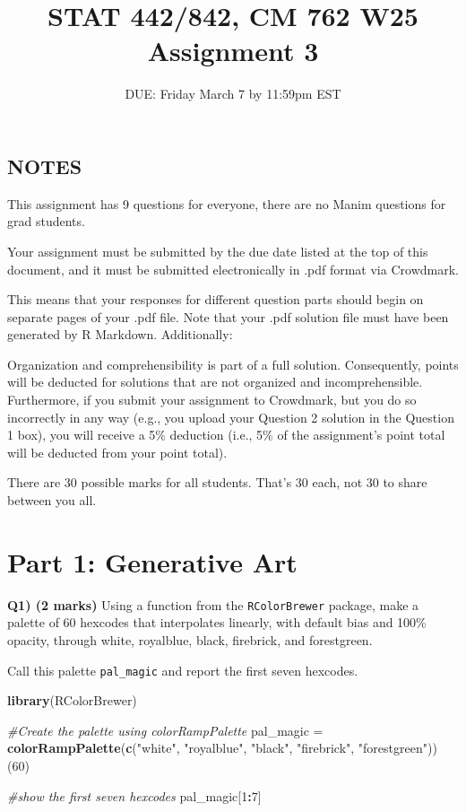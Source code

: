 \documentclass[
]{article}
\title{STAT 442/842, CM 762 W25 Assignment 3}
\subtitle{DUE: Friday March 7 by 11:59pm EST}
\author{}
\date{\vspace{-2.5em}}
\newenvironment{Shaded}{\begin{snugshade}}{\end{snugshade}}
\newcommand{\CommentTok}[1]{\textcolor[rgb]{0.56,0.35,0.01}{\textit{#1}}}
\newcommand{\DecValTok}[1]{\textcolor[rgb]{0.00,0.00,0.81}{#1}}
\newcommand{\FunctionTok}[1]{\textcolor[rgb]{0.13,0.29,0.53}{\textbf{#1}}}
\newcommand{\NormalTok}[1]{#1}
\newcommand{\OtherTok}[1]{\textcolor[rgb]{0.56,0.35,0.01}{#1}}
\newcommand{\SpecialCharTok}[1]{\textcolor[rgb]{0.81,0.36,0.00}{\textbf{#1}}}
\newcommand{\StringTok}[1]{\textcolor[rgb]{0.31,0.60,0.02}{#1}}
\begin{document}
\maketitle

\subsection{NOTES}\label{notes}

This assignment has 9 questions for everyone, there are no Manim
questions for grad students.

Your assignment must be submitted by the due date listed at the top of
this document, and it must be submitted electronically in .pdf format
via Crowdmark.

This means that your responses for different question parts should begin
on separate pages of your .pdf file. Note that your .pdf solution file
must have been generated by R Markdown. Additionally:

Organization and comprehensibility is part of a full solution.
Consequently, points will be deducted for solutions that are not
organized and incomprehensible. Furthermore, if you submit your
assignment to Crowdmark, but you do so incorrectly in any way (e.g., you
upload your Question 2 solution in the Question 1 box), you will receive
a 5\% deduction (i.e., 5\% of the assignment's point total will be
deducted from your point total).

There are 30 possible marks for all students. That's 30 each, not 30 to
share between you all.

\newpage

\section{Part 1: Generative Art}\label{part-1-generative-art}

\textbf{Q1) (2 marks)} Using a function from the \texttt{RColorBrewer}
package, make a palette of 60 hexcodes that interpolates linearly, with
default bias and 100\% opacity, through white, royalblue, black,
firebrick, and forestgreen.

Call this palette \texttt{pal\_magic} and report the first seven
hexcodes.

\begin{Shaded}
\begin{Highlighting}[]
\FunctionTok{library}\NormalTok{(RColorBrewer)}

\CommentTok{\#Create the palette using colorRampPalette}
\NormalTok{pal\_magic }\OtherTok{=} \FunctionTok{colorRampPalette}\NormalTok{(}\FunctionTok{c}\NormalTok{(}\StringTok{"white"}\NormalTok{, }\StringTok{"royalblue"}\NormalTok{, }\StringTok{"black"}\NormalTok{, }\StringTok{"firebrick"}\NormalTok{, }\StringTok{"forestgreen"}\NormalTok{))(}\DecValTok{60}\NormalTok{)}

\CommentTok{\#show the first seven hexcodes}
\NormalTok{pal\_magic[}\DecValTok{1}\SpecialCharTok{:}\DecValTok{7}\NormalTok{]}
\end{Highlighting}
\end{Shaded}
\end{document}
